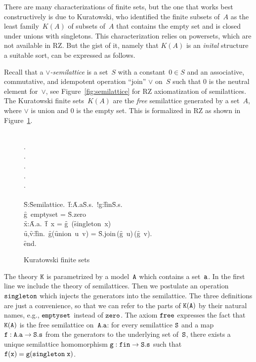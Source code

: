 There are many characterizations of finite sets, but the one that
works best constructively is due to Kuratowski, who identified the
finite subsets of~$A$ as the least family~$K(A)$ of subsets of~$A$
that contains the empty set and is closed under unions with
singletons. This characterization relies on powersets, which are not
available in RZ. But the gist of it, namely that $K(A)$ is an
\emph{inital} structure a suitable sort, can be expressed as follows.

Recall that a \emph{$\vee$-semilattice} is a set~$S$ with a
constant~$0 \in S$ and an associative, commutative, and idempotent
operation ``join'' $\vee$ on~$S$ such that $0$ is the neutral element
for~$\vee$, see Figure~\ref{fig:semilattice} for RZ axiomatization of
semilattices.
%
The Kuratowski finite sets~$K(A)$ are the \emph{free} semilattice
generated by a set~$A$, where $\vee$ is union and $0$ is the empty
set. This is formalized in RZ as shown in Figure~\ref{fig:kuratowski}.
%
\begin{figure}
\begin{showInput}
\\
\qquad {}.\\
\qquad {}.\\
\qquad {}.\\
\qquad {}.\\
\qquad {}.\\
\\
\qquad {} \forall \f{S}:\f{Semilattice}.\ \forall\f{f}:{\f{A.a}\to\f{S.s}}.\ \exists!g:\f{fin}{\to}{\f{S.s}}.\\
\qquad \qquad \qquad \qquad \qquad \f{g\ emptyset} = \f{S.zero}\ \land\\
\qquad \qquad \qquad \qquad \qquad \forall\f{x}:\f{A.a}.\ \f{f\ x} = \f{g}\ (\f{singleton\ x})\ \land\\
\qquad \qquad \qquad \qquad \qquad \forall\f{u},\f{v}:\f{fin}.\ \f{g}(\f{union\ u\ v}) = \f{S.join}\,(\f{g\ u})\,(\f{g\ v}).\\
\f{end}.
\end{showInput}
  \caption{Kuratowski finite sets}
  \label{fig:kuratowski}
\end{figure}
%
The theory $\mathtt{K}$ is parametrized by a model~$\mathtt{A}$ which contains a
set~$\mathtt{a}$. In the first line we include the theory of semilattices.
Then we postulate an operation $\mathtt{singleton}$ which injects the
generators into the semilattice. The three definitions are just a
convenience, so that we can refer to the parts of $\mathtt{K(A)}$ by their
natural names, e.g., $\mathtt{emptyset}$ instead of $\mathtt{zero}$. The axiom
$\mathtt{free}$ expresses the fact that $\mathtt{K}(\mathtt{A})$ is the free
semilattice on~$\mathtt{A.a}$: for every semilattice $\mathtt{S}$ and a map
$\mathtt{f} : \mathtt{A.a} \to \mathtt{S.s}$ from the generators to the underlying
set of~$\mathtt{S}$, there exists a unique semilattice homomorphism $\mathtt{g}
: \mathtt{fin} \to \mathtt{S.s}$ such that $\mathtt{f}(\mathtt{x}) = \mathtt{g}(\mathtt{singleton\;
  x})$.


